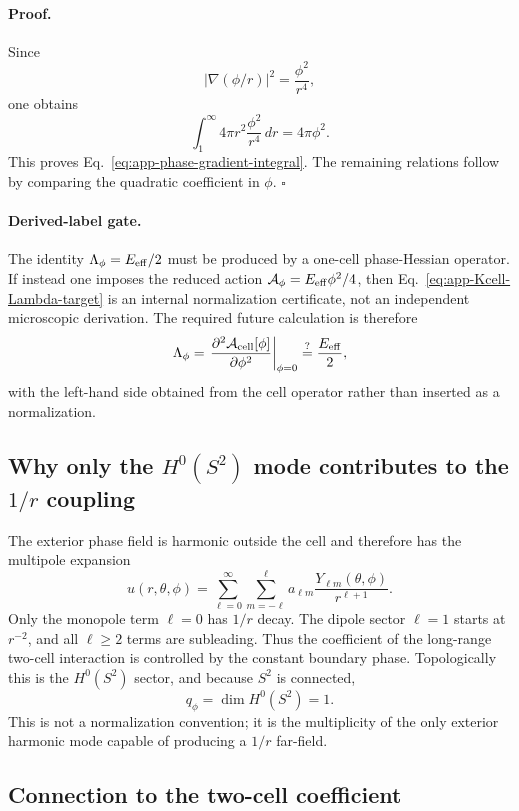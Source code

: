 \documentclass[11pt]{article}
\begin{document}
\paragraph{Proof.}
Since
\[
  |\nabla(\phi/r)|^2=\frac{\phi^2}{r^4},
\]
one obtains
\[
  \int_1^\infty 4\pi r^2\frac{\phi^2}{r^4}\,dr=4\pi\phi^2.
\]
This proves Eq.~\eqref{eq:app-phase-gradient-integral}.  The remaining
relations follow by comparing the quadratic coefficient in \(\phi\). \(\square\)

\paragraph{Derived-label gate.}
The identity \(\Lambda_\phi=E_{\rm eff}/2\) must be produced by a one-cell
phase-Hessian operator.  If instead one imposes the reduced action
\(\mathcal A_\phi=E_{\rm eff}\phi^2/4\), then
Eq.~\eqref{eq:app-Kcell-Lambda-target} is an internal normalization certificate,
not an independent microscopic derivation.  The required future calculation is
therefore
\[
  \Lambda_\phi
  =
  \left.
  \frac{\partial^2\mathcal A_{\rm cell}[\phi]}
       {\partial\phi^2}
  \right|_{\phi=0}
  \stackrel{?}{=}
  \frac{E_{\rm eff}}{2},
\]
with the left-hand side obtained from the cell operator rather than inserted as
a normalization.


\subsection{Why only the \(H^0(S^2)\) mode contributes to the \(1/r\) coupling}

The exterior phase field is harmonic outside the cell and therefore has the
multipole expansion
\[
  u(r,\theta,\phi)
  =
  \sum_{\ell=0}^{\infty}\sum_{m=-\ell}^{\ell}
  a_{\ell m}
  \frac{Y_{\ell m}(\theta,\phi)}{r^{\ell+1}}.
\]
Only the monopole term \(\ell=0\) has \(1/r\) decay.  The dipole sector
\(\ell=1\) starts at \(r^{-2}\), and all \(\ell\ge2\) terms are subleading.
Thus the coefficient of the long-range two-cell interaction is controlled by
the constant boundary phase.  Topologically this is the \(H^0(S^2)\) sector,
and because \(S^2\) is connected,
\[
  q_\phi=\dim H^0(S^2)=1.
\]
This is not a normalization convention; it is the multiplicity of the only
exterior harmonic mode capable of producing a \(1/r\) far-field.

\subsection{Connection to the two-cell coefficient}
\end{document}

